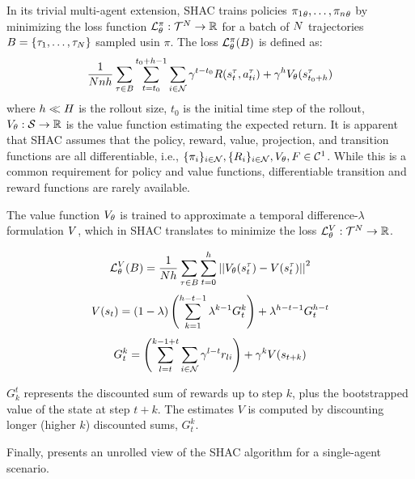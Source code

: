 In its trivial multi-agent extension, SHAC trains policies ${\pi_1}_\theta,\dots,{\pi_n}_\theta$ by minimizing the loss function $\mathcal{L}_\theta^{\pi}:\mathcal{T}^N\rightarrow\mathbb{R}$ for a batch of $N$ trajectories $B = \{\tau_1, \ldots, \tau_N\}$ sampled usin $\pi$. The loss $\mathcal{L}_\theta^{\pi}(B)$ is defined as:  
\begin{equation*}\label{eq:shac}
    \frac{1}{Nnh}\sum_{\tau\in B} \sum_{t=t_0}^{t_0+h-1} \sum_{i\in\mathcal{N}} \gamma^{t-t_0} R(s_{t}^\tau, a_{ti}^\tau) + \gamma^h V_\theta(s^\tau_{t_0+h})
\end{equation*}
where $h \ll H$ is the rollout size, $t_0$ is the initial time step of the rollout, $V_\theta: \mathcal{S} \rightarrow \mathbb{R}$ is the value function estimating the expected return. It is apparent that SHAC assumes that the policy, reward, value, projection, and transition functions are all differentiable, i.e., $\{\pi_{i}\}_{i\in\mathcal{N}},\{R_{i}\}_{i\in\mathcal{N}},V_\theta,F \in \mathcal{C}^1$. While this is a common requirement for policy and value functions, differentiable transition and reward functions are rarely available. 

The value function $V_\theta$ is trained to approximate a temporal difference-$\lambda$ formulation \cite{Sutton98} $V$, which in SHAC translates to minimize the loss $\mathcal{L}_\theta^{V}:\mathcal{T}^N\rightarrow\mathbb{R}$.

$$ \mathcal{L}_\theta^V(B)=\frac{1}{Nh}\sum_{\tau\in B}\sum_{t=0}^h\left|\left| V_\theta(s^\tau_t) - V(s^\tau_t) \right|\right|^2 $$
$$ V(s_t) = (1-\lambda) \left(\sum_{k=1}^{h-t-1}\lambda^{k-1}G_t^k\right) + \lambda^{h-t-1}G_t^{h-t}$$
$$ G_t^k = \left(\sum_{l=t}^{k-1+t}\sum_{i\in\mathcal{N}}\gamma^{l-t} r_{li}\right) + \gamma^k V(s_{t+k})$$

$G^t_k$ represents the discounted sum of rewards up to step $k$, plus the bootstrapped value of the state at step $t+k$. The estimates $V$ is computed by discounting longer (higher $k$) discounted sums, $G^k_t$.

Finally,  presents an unrolled view of the SHAC algorithm for a single-agent scenario.
